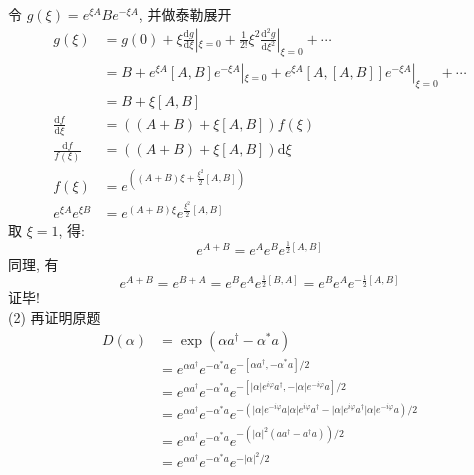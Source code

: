 \begin{frame}[allowframebreaks=]
       令 $g(\xi)= e^{\xi A} Be^{-\xi A}$, 并做泰勒展开
       \[\begin{aligned}
               g(\xi) &= g(0)+ \xi \frac{\mathrm{d}g}{\mathrm{d}\xi}|_{\xi=0}+ \frac{1}{2!}\xi^2 \frac{\mathrm{d}^2g}{\mathrm{d}\xi^2}|_{\xi=0}+ \cdots \\ 
               &= B + e^{\xi A}[A,B]e^{-\xi A}|_{\xi=0} + e^{\xi A}[A,[A,B]]e^{-\xi A}|_{\xi=0} + \cdots \\ 
               &= B + \xi[A,B] \\ 
           \frac{\mathrm{d}f}{\mathrm{d}\xi} &= ((A+ B) + \xi[A,B] )f(\xi) \\ 
           \frac{\mathrm{d}f}{f(\xi)} &= ((A+ B) + \xi[A,B] ) \mathrm{d}\xi\\ 
           f(\xi) &=  e^{((A+ B)\xi + \frac{\xi^2}{2} [A,B] )}\\ 
           e^{\xi A} e^{\xi B} &= e^{(A+ B)\xi} e^{\frac{\xi^2}{2} [A,B]}
           \end{aligned} \]
           取 $\xi=1$, 得:
           \[e^{A+B}= e^A e^B e^{\frac{1}{2}[A,B]}\] 
           同理, 有 
           \[e^{A+B} = e^{B+A} = e^B e^A e^{\frac{1}{2}[B,A]} =e^B e^A e^{-\frac{1}{2}[A,B]} \] 
           证毕! \\ 
    (2) 再证明原题
    \[ 
  \begin{aligned}
      D(\alpha) &=\exp \left(\alpha a^{\dagger}-\alpha^{*} a\right) \\  
      &= e^{\alpha a^{\dagger}} e^{-\alpha^{*} a} e^{-[\alpha a^{\dagger},-\alpha^{*} a]/2}  \\
      &= e^{\alpha a^{\dagger}} e^{-\alpha^{*} a} e^{-[\left|\alpha\right| e^{i\varphi} a^{\dagger},-\left|\alpha\right| e^{-i\varphi} a]/2}  \\
      &= e^{\alpha a^{\dagger}} e^{-\alpha^{*} a} e^{-(\left|\alpha\right| e^{-i\varphi} a\left|\alpha\right| e^{i\varphi} a^{\dagger}- \left|\alpha\right| e^{i\varphi} a^{\dagger}\left|\alpha\right| e^{-i\varphi} a)/2}  \\
      &= e^{\alpha a^{\dagger}} e^{-\alpha^{*} a} e^{-(\left|\alpha\right|^2  (a a^{\dagger}-  a^{\dagger} a))/2}  \\
      &= e^{\alpha a^{\dagger}} e^{-\alpha^{*} a} e^{-\left|\alpha\right|^2 /2} \\
  \end{aligned}  
    \]
 \end{frame}

